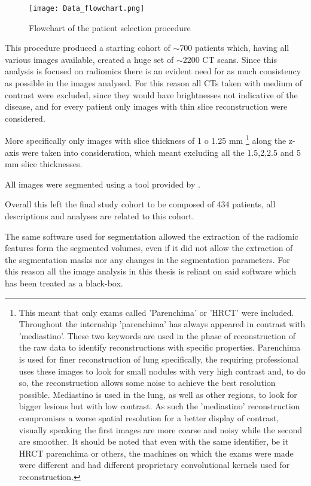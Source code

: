 \begin{figure}
\texttt{[image: Data\_flowchart.png]}
\caption{Flowchart of the patient selection procedure \label{fig:dataSelFlowchart}}
\end{figure}

This procedure produced a starting cohort of $\sim$700 patients which, having all various images available, created a huge set of $\sim$2200 CT scans. Since this analysis is focused on radiomics there is an evident need for as much consistency as possible in the images analysed. For this reason all CTs taken with medium of contrast were excluded, since they would have brightnesses not indicative of the disease, and for every patient only images with thin slice reconstruction were considered. 

More specifically only images with slice thickness of 1 o 1.25 mm
\footnote{This meant that only exams called 'Parenchima' or  'HRCT' were included. Throughout the internship 'parenchima' has always appeared in contrast with 'mediastino'. These two keywords are used in the phase of reconstruction of the raw data to identify reconstructions with specific properties. Parenchima is used for finer reconstruction of lung specifically, the requiring professional uses these images to look for small nodules with very high contrast and, to do so, the reconstruction allows some noise to achieve the best resolution possible. Mediastino is used in the lung, as well as other regions, to look for bigger lesions but with low contrast. As such the 'mediastino' reconstruction compromises a worse spatial resolution for a better display of contrast, visually speaking the first images are more coarse and noisy while the second are smoother. It should be noted that even with the same identifier, be it HRCT parenchima or others, the machines on which the exams were made were different and had different proprietary convolutional kernels used for reconstruction.} 
along the z-axis were taken into consideration, which meant excluding all the 1.5,2,2.5 and 5 mm slice thicknesses.

All images were segmented using a tool provided by \orsola.

Overall this left the final study cohort to be composed of 434 patients, all descriptions and analyses are related to this cohort.

The same software used for segmentation allowed the extraction of the radiomic features form the segmented volumes, even if it did not allow the extraction of the segmentation masks nor any changes in the segmentation parameters. For this reason all the image analysis in this thesis is reliant on said software which has been treated as a black-box.

